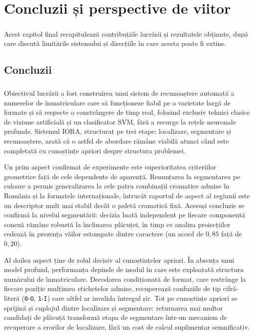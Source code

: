 \chapter{Concluzii și perspective de viitor}
\label{chap:concluzii}

\paragraph{}
Acest capitol final recapitulează contribuțiile lucrării și rezultatele obținute, după care discută limitările sistemului și direcțiile în care acesta poate fi extins.

\section{Concluzii}

\paragraph{}
Obiectivul lucrării a fost construirea unui sistem de recunoaștere automată a numerelor de înmatriculare care să funcționeze fiabil pe o varietate largă de formate și să respecte o constrângere de timp real, folosind exclusiv tehnici clasice de viziune artificială și un clasificator SVM, fără a recurge la rețele neuronale profunde. Sistemul IORA, structurat pe trei etape: localizare, segmentare și recunoaștere, arată că o astfel de abordare rămâne viabilă atunci când este completată cu cunoștințe apriori despre structura problemei.

Un prim aspect confirmat de experimente este superioritatea criteriilor geometrice față de cele dependente de aparență. Renunțarea la segmentarea pe culoare a permis generalizarea la cele patru combinații cromatice admise în România și la formatele internaționale, întrucât raportul de aspect al regiunii este un descriptor mult mai stabil decât o paletă cromatică fixă. Aceeași concluzie se confirmă la nivelul segmentării: decizia luată independent pe fiecare componentă conexă rămâne robustă la înclinarea plăcuței, în timp ce analiza proiecțiilor cedează în prezența văilor estompate dintre caractere (un acord de $0{,}85$ față de $0{,}20$).

Al doilea aspect ține de rolul decisiv al cunoștințelor apriori. În absența unui model profund, performanța depinde de modul în care este exploatată structura numărului de înmatriculare. Decodarea condiționată de format, care restrânge la fiecare poziție mulțimea etichetelor admise, recuperează confuziile de tip cifră-literă (\texttt{0}-\texttt{O}, \texttt{1}-\texttt{I}) care altfel ar invalida întregul șir. Tot pe cunoștințe apriori se sprijină și cuplajul dintre localizare și segmentare: returnarea mai multor candidați de plăcuță transformă etapa de segmentare într-un mecanism de recuperare a erorilor de localizare, fără un cost de calcul suplimentar semnificativ.

